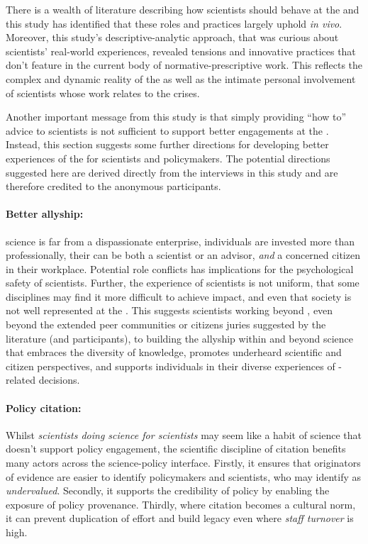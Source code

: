 There is a wealth of literature describing how scientists should behave at the \SPI{} and this study has identified that these roles and practices largely uphold \emph{in vivo}. Moreover, this study's descriptive-analytic approach, that was curious about scientists' real-world experiences, revealed tensions and innovative practices that don't feature in the current body of normative-prescriptive work. This reflects the complex and dynamic reality of the \SPI{} as well as the intimate personal involvement of scientists whose work relates to the \CAN{} crises. 

Another important message from this study is that simply providing ``how to'' advice to scientists is not sufficient to support better engagements at the \SPI. Instead, this section suggests some further directions for developing better experiences of the \SPI{} for scientists and policymakers. The potential directions suggested here are derived directly from the interviews in this study and are therefore credited to the anonymous participants.

\paragraph{Better allyship:}
\CAN{} science is far from a dispassionate enterprise, individuals are invested more than professionally, their \skirole{} can be both a scientist or an advisor, \emph{and} a concerned citizen in their workplace. Potential role conflicts has implications for the psychological safety of scientists. Further, the experience of scientists is not uniform, that some disciplines may find it more difficult to achieve impact, and even that society is not well represented at the \SPI{}. This suggests scientists working beyond \skinetw{}, even beyond the extended peer communities or citizens juries suggested by the literature (and participants), to building the allyship within and beyond science that embraces the diversity of knowledge, promotes underheard scientific and citizen perspectives, and supports individuals in their diverse experiences of \CAN-related decisions.

\paragraph{Policy citation:}
Whilst \emph{scientists doing science for scientists} may seem like a habit of science \skiinst{} that doesn't support policy engagement, the scientific discipline of citation benefits many actors across the science-policy interface. Firstly, it ensures that originators of evidence are easier to identify policymakers and scientists, who may identify as \emph{undervalued}. Secondly, it supports the credibility of policy by enabling the exposure of policy provenance. Thirdly, where citation becomes a cultural norm, it can prevent duplication of effort and build legacy even where \emph{staff turnover} is high.

